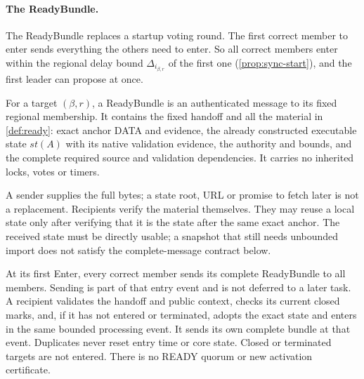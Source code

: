 \documentclass[11pt,a4paper]{article}
\begin{document}
\paragraph{The ReadyBundle.}
\label{sec:ready-bundle}
The ReadyBundle replaces a startup voting round. The first correct
member to enter sends everything the others need to enter. So all
correct members enter within the regional delay bound
$\Delta_{i_{\beta,r}}$ of the first one
(\cref{prop:sync-start}), and the first leader can propose at once.

For a target $(\beta,r)$, a ReadyBundle is an authenticated message to
its fixed regional membership. It contains the fixed handoff and all
the material in \cref{def:ready}: exact anchor DATA and evidence,
the already constructed executable state $\mathit{st}(A)$ with its
native validation evidence, the authority and bounds, and the complete
required source and validation dependencies. It carries no inherited
locks, votes or timers.

A sender supplies the full bytes; a state root, URL or promise to fetch
later is not a replacement. Recipients verify the material themselves.
They may reuse a local state only after verifying that it is the state
after the same exact anchor. The received state must be directly
usable; a snapshot that still needs unbounded import does not satisfy
the complete-message contract below.

At its first Enter, every correct member sends its complete ReadyBundle
to all members. Sending is part of that entry event and is not deferred
to a later task. A recipient validates the handoff and public context,
checks its current closed marks, and, if it has not entered or
terminated, adopts the exact state and enters in the same bounded
processing event. It sends its own complete bundle at that event.
Duplicates never reset entry time or core state. Closed or terminated
targets are not entered. There is no READY quorum or new activation
certificate.
\end{document}
